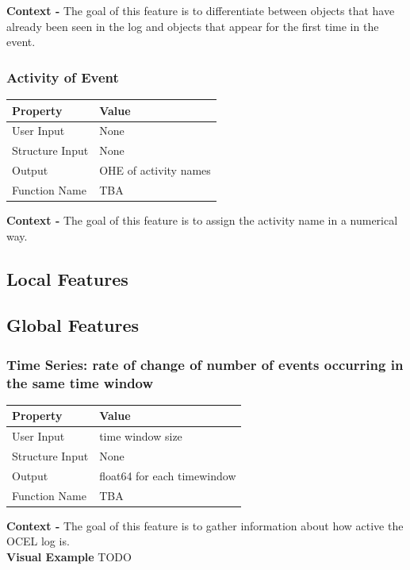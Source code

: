\documentclass{article}
\begin{document}
\textbf{Context -} The goal of this feature is to differentiate between objects that have already been seen in the log and objects that appear for the first time in the event.
\\

\subsubsection{Activity of Event}
\begin{center}
	\begin{tabular}{| p{3cm} p{7cm} |}
		\hline
		\textbf{Property} & \textbf{Value}\\
		\hline
		User Input & None\\
		Structure Input & None\\
		Output & OHE of activity names\\
		Function Name & TBA\\
		\hline
	\end{tabular}
\end{center}

\textbf{Context -} The goal of this feature is to assign the activity name in a numerical way.
\\

\subsection{Local Features}
\subsection{Global Features}

\subsubsection{Time Series: rate of change of number of events occurring in the same time window}
\begin{center}
	\begin{tabular}{| p{3cm} p{7cm} |}
		\hline
		\textbf{Property} & \textbf{Value}\\
		\hline
		User Input & time window size\\
		Structure Input & None\\
		Output & float64 for each timewindow\\
		Function Name & TBA\\
		\hline
	\end{tabular}
\end{center}

\textbf{Context -} The goal of this feature is to gather information about how active the OCEL log is.
\\

\textbf{Visual Example}
TODO
\end{document}
